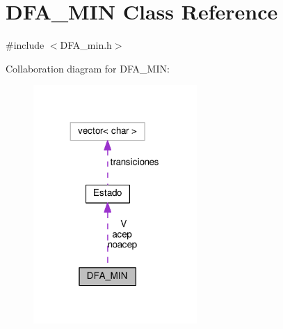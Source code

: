 \hypertarget{classDFA__MIN}{}\section{D\+F\+A\+\_\+\+M\+IN Class Reference}
\label{classDFA__MIN}


{\ttfamily \#include $<$D\+F\+A\+\_\+min.\+h$>$}



Collaboration diagram for D\+F\+A\+\_\+\+M\+IN\+:
\nopagebreak
\begin{figure}[H]
\begin{center}
\leavevmode
\includegraphics[width=176pt]{classDFA__MIN__coll__graph}
\end{center}
\end{figure}
